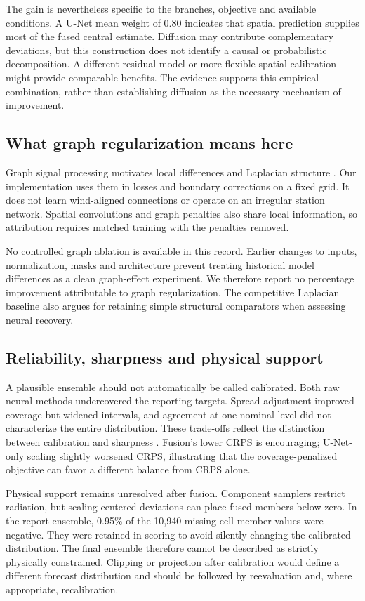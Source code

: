 \documentclass[preprint,12pt,authoryear]{elsarticle}
\begin{document}
The gain is nevertheless specific to the branches, objective and available conditions. A U-Net mean weight of 0.80 indicates that spatial prediction supplies most of the fused central estimate. Diffusion may contribute complementary deviations, but this construction does not identify a causal or probabilistic decomposition. A different residual model or more flexible spatial calibration might provide comparable benefits. The evidence supports this empirical combination, rather than establishing diffusion as the necessary mechanism of improvement.

\subsection{What graph regularization means here}
Graph signal processing motivates local differences and Laplacian structure \citep{shuman2013}. Our implementation uses them in losses and boundary corrections on a fixed grid. It does not learn wind-aligned connections or operate on an irregular station network. Spatial convolutions and graph penalties also share local information, so attribution requires matched training with the penalties removed.

No controlled graph ablation is available in this record. Earlier changes to inputs, normalization, masks and architecture prevent treating historical model differences as a clean graph-effect experiment. We therefore report no percentage improvement attributable to graph regularization. The competitive Laplacian baseline also argues for retaining simple structural comparators when assessing neural recovery.

\subsection{Reliability, sharpness and physical support}
A plausible ensemble should not automatically be called calibrated. Both raw neural methods undercovered the reporting targets. Spread adjustment improved coverage but widened intervals, and agreement at one nominal level did not characterize the entire distribution. These trade-offs reflect the distinction between calibration and sharpness \citep{gneiting2007calibration}. Fusion's lower CRPS is encouraging; U-Net-only scaling slightly worsened CRPS, illustrating that the coverage-penalized objective can favor a different balance from CRPS alone.

Physical support remains unresolved after fusion. Component samplers restrict radiation, but scaling centered deviations can place fused members below zero. In the report ensemble, 0.95\% of the 10,940 missing-cell member values were negative. They were retained in scoring to avoid silently changing the calibrated distribution. The final ensemble therefore cannot be described as strictly physically constrained. Clipping or projection after calibration would define a different forecast distribution and should be followed by reevaluation and, where appropriate, recalibration.
\end{document}
